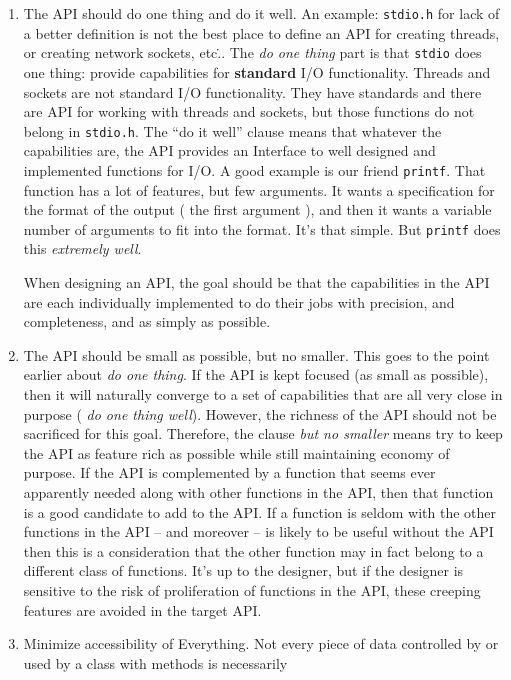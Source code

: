 \documentclass[12pt]{article}
\begin{document}
\begin{enumerate}
\begin{enumerate}
  \item The API should do one thing and do it well.   An example:  {\texttt{stdio.h}} for lack of a better definition is not the best place to define an API
for creating threads, or creating network sockets, etc\...  The {\textit{do 
one thing}} part is that {\texttt{stdio}} does one thing: provide capabilities
for {\textbf{standard}} I/O functionality.   Threads and sockets are not
standard I/O functionality.  They have standards and there are API for
working with threads and sockets, but those functions do not belong in
{\texttt{stdio.h}}.   The ``do it well'' clause means that whatever
the capabilities are, the API provides an  Interface to well designed
and implemented functions for I/O.  A good example is our friend
{\texttt{printf}}.  That function has a lot of features, but few arguments.
It wants a specification for the format of the output ( the first argument ),
and then it wants a variable number of arguments to fit into the format.
It's that simple.  But {\texttt{printf}} does this {\textit{extremely well}}.
\par
When designing an API, the goal should be that the capabilities in the
API are each individually implemented to do their jobs with precision,
and completeness, and as simply as possible.
\item The API should be small as possible, but no smaller.  This goes
to the point earlier about {\textit{do one thing}}.  If the API is kept
focused (as small as possible), then it will naturally converge to
a set of capabilities that are all very close in purpose ({\textit{ do
one thing well}}).  However, the richness of the API should not be
sacrificed for this goal.  Therefore, the clause {\textit{but no smaller}}
means try to keep the API as feature rich as possible while still maintaining
economy of purpose.  If the API is complemented by a function that seems
ever apparently needed along with other functions in the API, then
that function is a good candidate to add to the API.  If a function is
seldom with the other functions in the API -- and moreover -- is likely
to be useful without the API then this is a consideration that the
other function may in fact belong to a different class of functions.
It's up to the designer, but if the designer is sensitive to the
risk of proliferation of functions in the API, these creeping features
are avoided in the target API.
\item Minimize accessibility of Everything.   Not every piece of
data controlled by or used by a class with methods is necessarily

\end{enumerate}
\end{enumerate}
\end{document}

